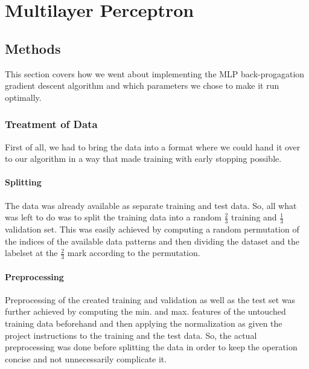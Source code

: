 \section{Multilayer Perceptron}

\subsection{Methods}
This section covers how we went about implementing the MLP back-progagation gradient descent algorithm and which parameters we chose to make it run optimally. 
\subsubsection{Treatment of Data}
First of all, we had to bring the data into a format where we could hand it over to our algorithm in a way that made training with early stopping possible.
\paragraph{Splitting}
The data was already available as separate training and test data. So, all what was left to do was to split the training data into a random $\frac{2}{3}$ training and $\frac{1}{3}$ validation set. This was easily achieved by computing a random permutation of the indices of the available data patterns and then dividing the dataset and the labelset at the $\frac{2}{3}$ mark according to the permutation.  
\paragraph{Preprocessing}
Preprocessing of the created training and validation as well as the test set was further achieved by computing the min. and max. features of the untouched training data beforehand and then applying the normalization as given the project instructions to the training and the test data. So, the actual preprocessing was done before splitting the data in order to keep the operation concise and not unnecessarily complicate it. 

